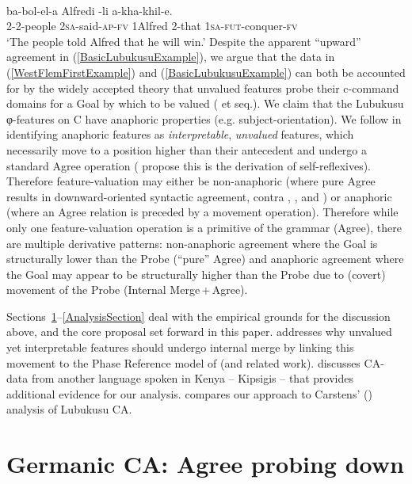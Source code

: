 \documentclass[output=paper
,modfonts
,nonflat
]{langsci/langscibook}
\begin{document}
\ea \label{BasicLubukusuExample}
\\
\gll {}	ba-bol-el-a	Alfredi	-li	a-kha-khil-e.\\
	2-2-people 	2\textsc{sa}-said-\textsc{ap}-\textsc{fv}	1Alfred	2-that	1\textsc{sa}-\textsc{fut}-conquer-\textsc{fv} \\
\glt `The people told Alfred that he will win.'	
\z
\noindent Despite the apparent ``upward'' agreement in (\ref{BasicLubukusuExample}), we argue that the data in (\ref{WestFlemFirstExample}) and (\ref{BasicLubukusuExample}) can both be accounted for by the widely accepted theory that unvalued features probe their c-command domains for a Goal by which to be valued (\citealt{Chomsky2000} et seq.).  We claim that the Lubukusu φ-features on C have anaphoric properties (e.g. subject-orientation). We follow \citet{Rooryck:2011} in identifying anaphoric features as \textit{interpretable}, \textit{unvalued} features, which necessarily move to a position higher than their antecedent and undergo a standard Agree operation (\citeauthor{Rooryck:2011} propose this is the derivation of self-reflexives). Therefore feature-valuation may either be non-anaphoric (where pure Agree results in downward-oriented syntactic agreement, contra \citealt{Zeijlstra:2012}, \citealt{Wurmbrand:2011}, and \citealt{Bjorkman:toappearb}) or anaphoric (where an Agree relation is preceded by a movement operation). Therefore while only one feature-valuation operation is a primitive of the grammar (Agree), there are multiple derivative patterns: non-anaphoric agreement where the Goal is structurally lower than the Probe (``pure'' Agree) and anaphoric agreement where the Goal may appear to be structurally higher than the Probe due to (covert) movement of the Probe (Internal Merge\,+\,Agree). 

Sections~\ref{GermanicCA}--\ref{AnalysisSection} deal with the empirical grounds for the discussion above, and the core proposal set forward in this paper.  addresses why unvalued yet interpretable features should undergo internal merge by linking this movement to the Phase Reference model of \citet{Hinzen:2012} (and related work).  discusses CA-data from another language spoken in Kenya -- Kipsigis -- that provides additional evidence for our analysis.  compares our approach to Carstens' (\citeyear{Carstens:2016}) analysis of Lubukusu CA.

\section{Germanic CA: Agree probing down} \label{GermanicCA}\largerpage
\end{document}
